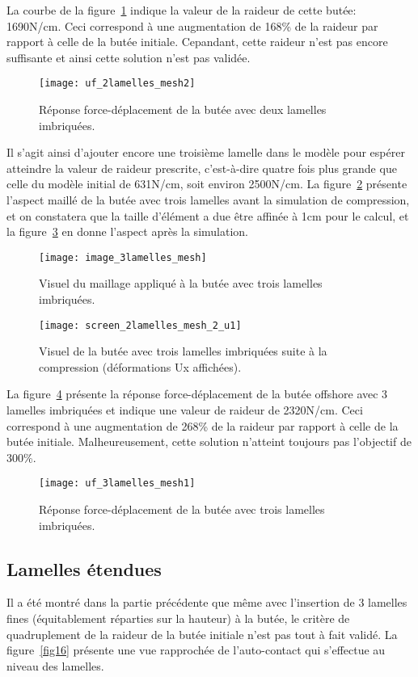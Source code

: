 ﻿\documentclass{article}
\newcommand{\cimg}{0.8}
\begin{document}
La courbe de la figure~\ref{fig12} indique la valeur de la raideur de cette butée: 1690N/cm. Ceci correspond à une augmentation de 168\% de la raideur par rapport à celle de la butée initiale. Cepandant, cette raideur n'est pas encore suffisante et ainsi cette solution n'est pas validée.
 
\begin{figure}[!h]
	\centering
	\texttt{[image: uf\_2lamelles\_mesh2]}
	\caption{Réponse force-déplacement de la butée avec deux lamelles imbriquées.}
	\label{fig12}
\end{figure}

Il s'agit ainsi d'ajouter encore une troisième lamelle dans le modèle pour espérer atteindre la valeur de raideur prescrite, c'est-à-dire quatre fois plus grande que celle du modèle initial de 631N/cm, soit environ 2500N/cm. La figure~\ref{fig13} présente l'aspect maillé de la butée avec trois lamelles avant la simulation de compression, et on constatera que la taille d'élément a due être affinée à 1cm pour le calcul, et la figure~\ref{fig14} en donne l'aspect après la simulation.

\begin{figure}[!h]
	\centering
	\texttt{[image: image\_3lamelles\_mesh]}
	\caption{Visuel du maillage appliqué à la butée avec trois lamelles imbriquées.}
	\label{fig13}
\end{figure}

\begin{figure}[!h]
	\centering
	\texttt{[image: screen\_2lamelles\_mesh\_2\_u1]}
	\caption{Visuel de la butée avec trois lamelles imbriquées suite à la compression (déformations Ux affichées).}
	\label{fig14}
\end{figure}

La figure~\ref{fig15} présente la réponse force-déplacement de la butée offshore avec 3 lamelles imbriquées et indique une valeur de raideur de 2320N/cm. Ceci correspond à une augmentation de 268\% de la raideur par rapport à celle de la butée initiale. Malheureusement, cette solution n'atteint toujours pas l'objectif de 300\%.
 
\begin{figure}[!h]
	\centering
	\texttt{[image: uf\_3lamelles\_mesh1]}
	\caption{Réponse force-déplacement de la butée avec trois lamelles imbriquées.}
	\label{fig15}
\end{figure}

\subsection{Lamelles étendues}
Il a été montré dans la partie précédente que même avec l'insertion de 3 lamelles fines (équitablement réparties sur la hauteur) à la butée, le critère de quadruplement de la raideur de la butée initiale n'est pas tout à fait validé. La figure~\ref{fig16} présente une vue rapprochée de l'auto-contact qui s'effectue au niveau des lamelles.
\end{document}
